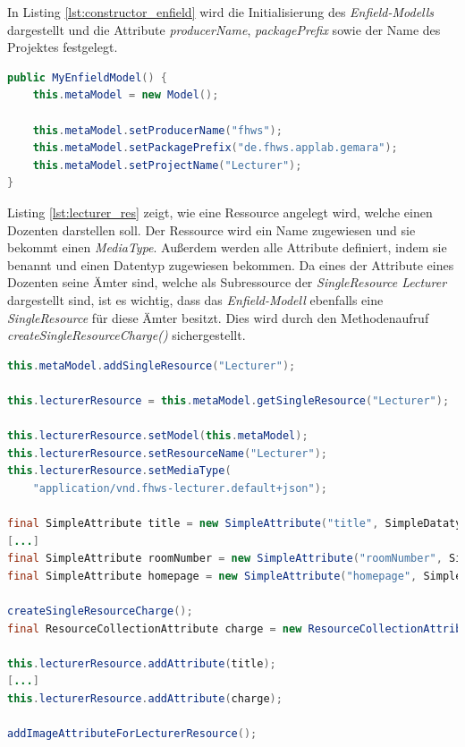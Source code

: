 In Listing \ref{lst:constructor_enfield} wird die Initialisierung des \textit{Enfield-Modells} dargestellt und die Attribute \textit{producerName}, \textit{packagePrefix} sowie der Name des Projektes festgelegt.

\begin{lstlisting}[label=lst:constructor_enfield,
language=java,
firstnumber=1,
caption=Initialisierung des \textit{Enfield-Meta-Modells}.]	
public MyEnfieldModel() {
	this.metaModel = new Model();

	this.metaModel.setProducerName("fhws");
	this.metaModel.setPackagePrefix("de.fhws.applab.gemara");
	this.metaModel.setProjectName("Lecturer");
}
\end{lstlisting}

Listing \ref{lst:lecturer_res} zeigt, wie eine Ressource angelegt wird, welche einen Dozenten darstellen soll. Der Ressource wird ein Name zugewiesen und sie bekommt einen \textit{MediaType}. Außerdem werden alle Attribute definiert, indem sie benannt und einen Datentyp zugewiesen bekommen.
 Da eines der Attribute eines Dozenten seine Ämter sind, welche als Subressource der \textit{SingleResource Lecturer} dargestellt sind, ist es wichtig, dass das \textit{Enfield-Modell} ebenfalls eine \textit{SingleResource} für diese Ämter besitzt. Dies wird durch den Methodenaufruf \textit{createSingleResourceCharge()} sichergestellt.

\newpage

\begin{lstlisting}[label=lst:lecturer_res,
language=java,
firstnumber=1,
caption=Erzeugung der \textit{SingleResource} \textit{Lecturer}. ]
this.metaModel.addSingleResource("Lecturer");

this.lecturerResource = this.metaModel.getSingleResource("Lecturer");

this.lecturerResource.setModel(this.metaModel);
this.lecturerResource.setResourceName("Lecturer");
this.lecturerResource.setMediaType(
	"application/vnd.fhws-lecturer.default+json");

final SimpleAttribute title = new SimpleAttribute("title", SimpleDatatype.STRING);
[...]
final SimpleAttribute roomNumber = new SimpleAttribute("roomNumber", SimpleDatatype.STRING);
final SimpleAttribute homepage = new SimpleAttribute("homepage", SimpleDatatype.LINK);

createSingleResourceCharge();
final ResourceCollectionAttribute charge = new ResourceCollectionAttribute("chargeUrl", this.chargeResource);

this.lecturerResource.addAttribute(title);
[...]
this.lecturerResource.addAttribute(charge);

addImageAttributeForLecturerResource();
\end{lstlisting}

